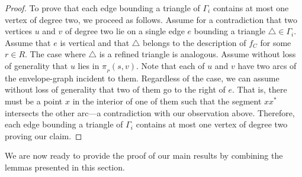 \documentclass[a4paper,UKenglish]{socg-lipics-v2018}
\newcommand{\p}[3][P]{\ensuremath{\pi_{_{#1}}(#2, #3)}}
\begin{document}
\begin{proof}
To prove that each edge bounding a triangle of $\Gamma_i$ contains at most one vertex of degree two, we proceed as follows.
Assume for a contradiction that two vertices $u$ and $v$ of degree two lie on a single edge $e$ bounding a triangle $\triangle\in \Gamma_i$.
Assume that $e$ is vertical and that $\triangle$ belongs to the description of $f_C$ for some $r\in R$. 
The case where $\triangle$ is a refined triangle is analogous. Assume without loss of generality that $u$ lies in $\p{s}{v}$.
Note that each of $u$ and $v$ have two arcs of the envelope-graph incident to them.
Regardless of the case, we can assume without loss of generality that two of them go to the right of $e$. 
That is, there must be a point $x$ in the interior of one of them such that the segment $x x^*$ intersects the other arc---a contradiction with our observation above.
Therefore, each edge bounding a triangle of $\Gamma_i$ contains at most one vertex of degree two proving our claim.
\end{proof}

We are now ready to provide the proof of our main results by combining the lemmas presented in this section. 
\end{document}
